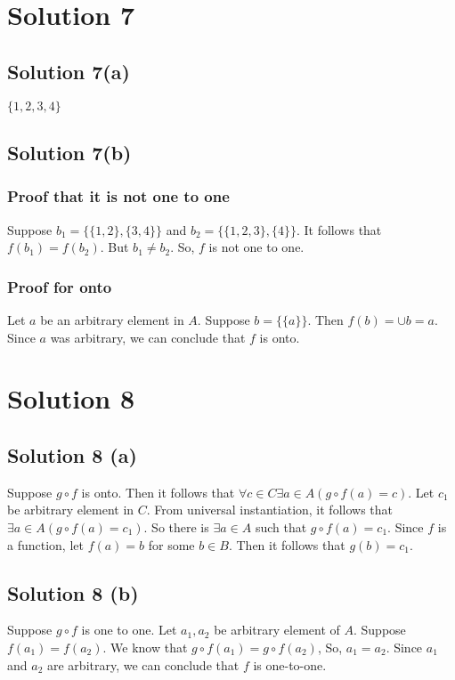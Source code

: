 \documentclass{article}
\begin{document}
\section{Solution 7}
\subsection{Solution 7(a)}
$\{1,2,3,4\}$

\subsection{Solution 7(b)}
\subsubsection{Proof that it is not one to one}
Suppose $b_1 = \{\{1,2\}, \{3,4\}\}$ and $b_2 = \{\{1,2,3\}, \{4\}\}$.
It follows that $f(b_1) = f(b_2)$. But $b_1 \neq b_2$. So, $f$ is not
one to one.

\subsubsection{Proof for onto}
Let $a$ be an arbitrary element in $A$. Suppose $b = \{\{a\}\}$. Then
$f(b) = \cup{b} = a$. Since $a$ was arbitrary, we can conclude that
$f$ is onto.

\section{Solution 8}
\subsection{Solution 8 (a)}
Suppose $g \circ f$ is onto. Then it follows that $\forall c \in C
\exists a \in A(g \circ f(a) = c)$. Let $c_1$ be arbitrary element in
$C$. From universal instantiation, it follows that $\exists a \in A(g
\circ f(a) = c_1)$. So there is $\exists a \in A$ such that $g \circ
f(a) = c_1$. Since $f$ is a function, let $f(a) = b$ for some $b \in
B$. Then it follows that $g(b) = c_1$.

\subsection{Solution 8 (b)}
Suppose $g \circ f$ is one to one. Let $a_1, a_2$ be arbitrary element
of $A$. Suppose $f(a_1) = f(a_2)$. We know that $g \circ f(a_1) = g
\circ f(a_2)$, So, $a_1 = a_2$. Since $a_1$ and $a_2$ are arbitrary,
we can conclude that $f$ is one-to-one.
\end{document}
